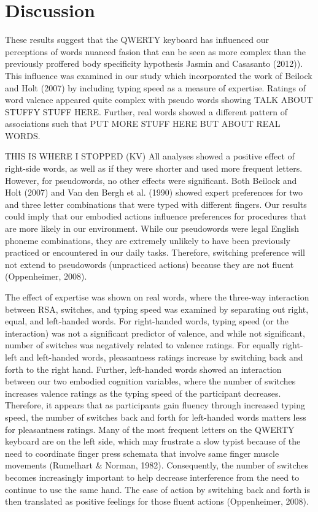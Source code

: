 \documentclass[english,man]{apa6}
\theoremstyle{definition}
\theoremstyle{definition}
\theoremstyle{definition}
\theoremstyle{remark}
\begin{document}
\section{Discussion}\label{discussion}

These results suggest that the QWERTY keyboard has influenced our
perceptions of words nuanced fasion that can be seen as more complex
than the previously proffered body specificity hypothesis Jasmin and
Casasanto (2012)). This influence was examined in our study which
incorporated the work of Beilock and Holt (2007) by including typing
speed as a measure of expertise. Ratings of word valence appeared quite
complex with pseudo words showing TALK ABOUT STUFFY STUFF HERE. Further,
real words showed a different pattern of associations such that PUT MORE
STUFF HERE BUT ABOUT REAL WORDS.

THIS IS WHERE I STOPPED (KV) All analyses showed a positive effect of
right-side words, as well as if they were shorter and used more frequent
letters. However, for pseudowords, no other effects were significant.
Both Beilock and Holt (2007) and Van den Bergh et al. (1990) showed
expert preferences for two and three letter combinations that were typed
with different fingers. Our results could imply that our embodied
actions influence preferences for procedures that are more likely in our
environment. While our pseudowords were legal English phoneme
combinations, they are extremely unlikely to have been previously
practiced or encountered in our daily tasks. Therefore, switching
preference will not extend to pseudowords (unpracticed actions) because
they are not fluent (Oppenheimer, 2008).

The effect of expertise was shown on real words, where the three-way
interaction between RSA, switches, and typing speed was examined by
separating out right, equal, and left-handed words. For right-handed
words, typing speed (or the interaction) was not a significant predictor
of valence, and while not significant, number of switches was negatively
related to valence ratings. For equally right-left and left-handed
words, pleasantness ratings increase by switching back and forth to the
right hand. Further, left-handed words showed an interaction between our
two embodied cognition variables, where the number of switches increases
valence ratings as the typing speed of the participant decreases.
Therefore, it appears that as participants gain fluency through
increased typing speed, the number of switches back and forth for
left-handed words matters less for pleasantness ratings. Many of the
most frequent letters on the QWERTY keyboard are on the left side, which
may frustrate a slow typist because of the need to coordinate finger
press schemata that involve same finger muscle movements (Rumelhart \&
Norman, 1982). Consequently, the number of switches becomes increasingly
important to help decrease interference from the need to continue to use
the same hand. The ease of action by switching back and forth is then
translated as positive feelings for those fluent actions (Oppenheimer,
2008).
\end{document}

